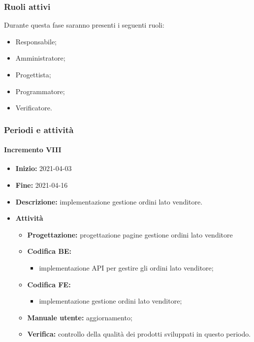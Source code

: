 \subsubsection{Ruoli attivi}
Durante questa fase saranno presenti i seguenti ruoli:
\begin{itemize}
    \item Responsabile;
    \item Amministratore;
    \item Progettista;
    \item Programmatore;
    \item Verificatore.
\end{itemize}

\subsubsection{Periodi e attività}

\paragraph[Incremento VIII]{Incremento VIII}
\begin{itemize}
    \item [] \textbf{Inizio:} 2021-04-03
    \item [] \textbf{Fine:} 2021-04-16
    \item [] \textbf{Descrizione:} implementazione gestione ordini lato venditore.
    \item [] \textbf{Attività}
          \begin{itemize}
              \item \textbf{Progettazione:} progettazione pagine gestione ordini lato venditore
              \item \textbf{Codifica BE:}
                    \begin{itemize}
                        \item implementazione API per gestire gli ordini lato venditore;
                    \end{itemize}
              \item \textbf{Codifica FE:}
                    \begin{itemize}
                        \item implementazione gestione ordini lato venditore;
                    \end{itemize}
              \item \textbf{Manuale utente:} aggiornamento;
              \item \textbf{Verifica:} controllo della qualità dei prodotti sviluppati in questo periodo.
          \end{itemize}
\end{itemize}

